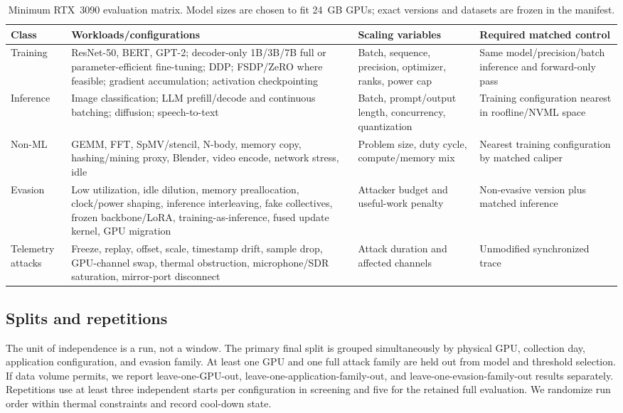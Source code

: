 \documentclass[sigplan,anonymous,review,nonacm]{acmart}
\begin{document}
\begin{table}[t]
\centering
\caption{Minimum RTX~3090 evaluation matrix. Model sizes are chosen to fit 24~GB GPUs; exact versions and datasets are frozen in the manifest.}
\label{tab:workloads}
\small
\begin{tabularx}{\textwidth}{p{2.2cm}Xp{3.0cm}p{3.3cm}}
\toprule
Class & Workloads/configurations & Scaling variables & Required matched control \\
\midrule
Training & ResNet-50, BERT, GPT-2; decoder-only 1B/3B/7B full or parameter-efficient fine-tuning; DDP; FSDP/ZeRO where feasible; gradient accumulation; activation checkpointing & Batch, sequence, precision, optimizer, ranks, power cap & Same model/precision/batch inference and forward-only pass \\
Inference & Image classification; LLM prefill/decode and continuous batching; diffusion; speech-to-text & Batch, prompt/output length, concurrency, quantization & Training configuration nearest in roofline/NVML space \\
Non-ML & GEMM, FFT, SpMV/stencil, N-body, memory copy, hashing/mining proxy, Blender, video encode, network stress, idle & Problem size, duty cycle, compute/memory mix & Nearest training configuration by matched caliper \\
Evasion & Low utilization, idle dilution, memory preallocation, clock/power shaping, inference interleaving, fake collectives, frozen backbone/LoRA, training-as-inference, fused update kernel, GPU migration & Attacker budget and useful-work penalty & Non-evasive version plus matched inference \\
Telemetry attacks & Freeze, replay, offset, scale, timestamp drift, sample drop, GPU-channel swap, thermal obstruction, microphone/SDR saturation, mirror-port disconnect & Attack duration and affected channels & Unmodified synchronized trace \\
\bottomrule
\end{tabularx}
\end{table}

\subsection{Splits and repetitions}

The unit of independence is a run, not a window. The primary final split is grouped simultaneously by physical GPU, collection day, application configuration, and evasion family. At least one GPU and one full attack family are held out from model and threshold selection. If data volume permits, we report leave-one-GPU-out, leave-one-application-family-out, and leave-one-evasion-family-out results separately. Repetitions use at least three independent starts per configuration in screening and five for the retained full evaluation. We randomize run order within thermal constraints and record cool-down state.
\end{document}
